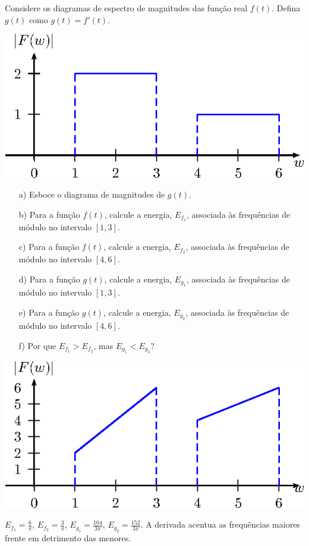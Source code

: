 \begin{exer} Considere os diagramas de espectro de magnitudes das função real $f(t)$. Defina $g(t)$ como $g(t)=f'(t)$.
    
    \begin{center}
        \includegraphics{cap_propriedades_transformada/pics/diagrama_7B}
    \end{center}
    \begin{itemize}
        \item[a)] Esboce o diagrama de magnitudes de $g(t)$.
        \item[b)] Para a função $f(t)$, calcule a energia, $E_{f_1}$, associada às frequências de módulo no intervalo $[1, 3]$.
        \item[c)] Para a função $f(t)$, calcule a energia, $E_{f_2}$, associada às frequências de módulo no intervalo $[4, 6]$.
        \item[d)] Para a função $g(t)$, calcule a energia, $E_{g_1}$, associada às frequências de módulo no intervalo $[1, 3]$.
        \item[e)] Para a função $g(t)$, calcule a energia, $E_{g_2}$, associada às frequências de módulo no intervalo $[4, 6]$.
        \item[f)] Por que $E_{f_1} > E_{f_2}$, mas $E_{g_1} < E_{g_2}$?
    \end{itemize}    
\end{exer}
\begin{resp}
    \begin{center}
        \includegraphics{cap_propriedades_transformada/pics/diagrama_7B2}
    \end{center}
        $E_{f_1} = \frac{6}{\pi}$, $E_{f_2} = \frac{3}{\pi}$, $E_{g_1} = \frac{104}{3\pi}$, $E_{g_2} = \frac{152}{3\pi}$. A derivada acentua as frequências maiores frente em detrimento das menores.
    \end{resp}
    


